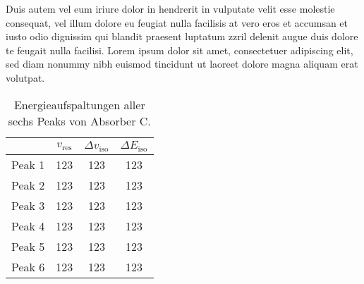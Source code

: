	Duis autem vel eum iriure dolor in hendrerit in vulputate velit esse molestie consequat, vel illum dolore eu feugiat nulla facilisis at vero eros et accumsan et iusto odio dignissim qui blandit praesent luptatum zzril delenit augue duis dolore te feugait nulla facilisi. Lorem ipsum dolor sit amet, consectetuer adipiscing elit, sed diam nonummy nibh euismod tincidunt ut laoreet dolore magna aliquam erat volutpat. 
	\begin{table}[ht]
		\centering
		\caption{Energieaufspaltungen aller sechs Peaks von Absorber C.} 
		\label{tab:isoC}
		\begin{tabular}{c|ccc}
			\toprule
			       & $v_\text{res}$ & $\Delta v_\text{iso}$ & $\Delta E_\text{iso}$ \\ \midrule
			Peak 1 &      123       &          123          &          123          \\
			Peak 2 &      123       &          123          &          123          \\
			Peak 3 &      123       &          123          &          123          \\
			Peak 4 &      123       &          123          &          123          \\
			Peak 5 &      123       &          123          &          123          \\
			Peak 6 &      123       &          123          &          123          \\ \bottomrule
		\end{tabular}
	\end{table} 
	